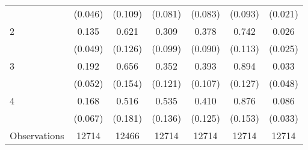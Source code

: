 {\begin{tabular}{l*{6}{c}}
                    &     (0.046)         &     (0.109)         &     (0.081)         &     (0.083)         &     (0.093)         &     (0.021)         \\
[1em]
2                   &       0.135\sym{***}&       0.621\sym{***}&       0.309\sym{***}&       0.378\sym{***}&       0.742\sym{***}&       0.026         \\
                    &     (0.049)         &     (0.126)         &     (0.099)         &     (0.090)         &     (0.113)         &     (0.025)         \\
[1em]
3                   &       0.192\sym{***}&       0.656\sym{***}&       0.352\sym{***}&       0.393\sym{***}&       0.894\sym{***}&       0.033         \\
                    &     (0.052)         &     (0.154)         &     (0.121)         &     (0.107)         &     (0.127)         &     (0.048)         \\
[1em]
4                   &       0.168\sym{**} &       0.516\sym{***}&       0.535\sym{***}&       0.410\sym{***}&       0.876\sym{***}&       0.086\sym{***}\\
                    &     (0.067)         &     (0.181)         &     (0.136)         &     (0.125)         &     (0.153)         &     (0.033)         \\
\hline
Observations        &       12714         &       12466         &       12714         &       12714         &       12714         &       12714         \\
\hline\hline
\end{tabular}
}
